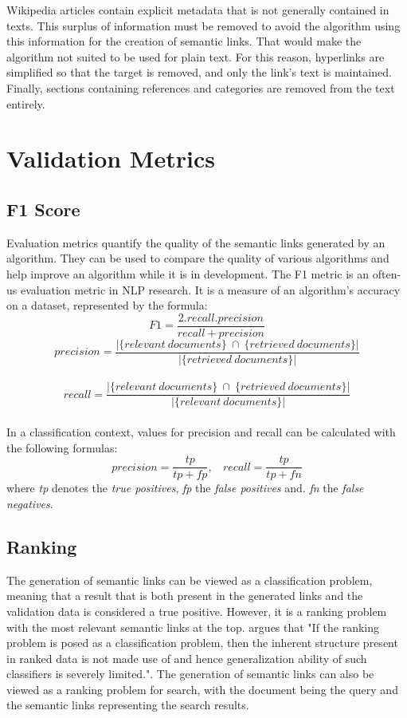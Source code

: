 Wikipedia articles contain explicit metadata that is not generally contained in texts. This surplus of information 
must be removed to avoid the algorithm using this information for the creation of semantic links. That would make the algorithm not suited to be used for plain text. For this reason, hyperlinks are simplified so that the target is removed, and only the link's text is maintained. Finally, sections containing references and categories are removed from the text entirely.\\

\section{Validation Metrics}
\label{secValidationMetrics}
\subsection{F1 Score}
\label{F1Score}
Evaluation metrics quantify the quality of the semantic links generated by an algorithm. They can be used to compare the quality of various algorithms and help improve an algorithm while it is in development. The F1 metric \cite{forman2003} is an often-us evaluation metric in NLP research. It is a measure of an algorithm’s accuracy on a dataset, represented by the formula:
$$F1 = \frac{ 2 . recall . precision}{recall + precision}$$
$$precision = \frac{|\{relevant\ documents\}\  \cap\  \{retrieved\ documents\}|}{|\{retrieved\ documents\}|} $$ \\
$$recall = \frac{|\{relevant\ documents\}\  \cap\  \{retrieved\ documents\}|}{|\{relevant\ documents\}|} $$ \\
In a classification context, values for precision and recall can be calculated with the following formulas:
$$precision = \frac{tp}{tp + fp},\ \ \ \ recall = \frac{tp}{tp + fn}$$ where \textit{tp} denotes the \textit{true positives}, \textit{fp} the \textit{false positives} and.  \textit{fn} the \textit{false negatives}.\\

\subsection{Ranking}
\label{ranking}
The generation of semantic links can be viewed as a classification problem, meaning that a result that is both present in the generated links and the validation data is considered a true positive. However, it is a ranking problem with the most relevant semantic links at the top. \cite{Rajaram2003} argues that "If the ranking problem is posed as a classification problem, then the inherent structure present in ranked data is not made use of and hence generalization ability of such classifiers is severely limited.".   The generation of semantic links can also be viewed as a ranking problem for search, with the document being the query and the semantic links representing the search results. \\

